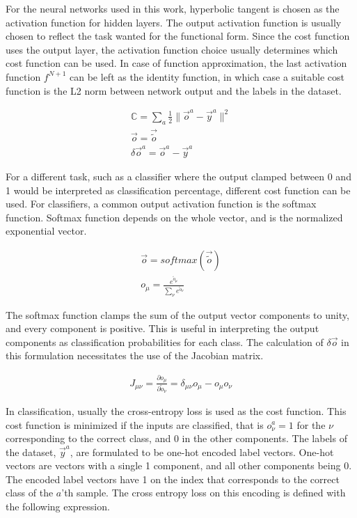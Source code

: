 \documentclass[../dissertation.tex]{subfiles}
\begin{document}
For the neural networks used in this work, hyperbolic tangent is chosen as the activation function for hidden layers.
The output activation function is usually chosen to reflect the task wanted for the functional form.
Since the cost function uses the output layer, the activation function choice usually determines which cost function can be used.
In case of function approximation, the last activation function $f^{N+1}$ can be left as the identity function, in which case a suitable cost function is the L2 norm between network output and the labels in the dataset.

\begin{align}
    \mathbb{C} = \sum_a \frac{1}{2} \| \vec{o}^a - \vec{y}^a \|^2 \\
    \vec{o} = \vec{\tilde{o}} \\
    \delta \vec{o}^a = \vec{o}^a - \vec{y}^a
\end{align}

For a different task, such as a classifier where the output clamped between 0 and 1 would be interpreted as classification percentage, different cost function can be used.
For classifiers, a common output activation function is the softmax function.
Softmax function depends on the whole vector, and is the normalized exponential vector.

\begin{align}
    \vec{o} = softmax \left( \vec{\tilde{o}} \right) \\
    o_\mu = \frac{e^{\tilde{o}_\mu}}{\sum_\nu e^{\tilde{o}_\nu}}
\end{align}

The softmax function clamps the sum of the output vector components to unity, and every component is positive.
This is useful in interpreting the output components as classification probabilities for each class.
The calculation of $\delta \vec{o}$ in this formulation necessitates the use of the Jacobian matrix.

\begin{align}
    J_{\mu\nu} = \frac{\partial o_\mu}{\partial \tilde{o}_\nu} = \delta_{\mu\nu} o_\mu - o_\mu o_\nu
\end{align}

In classification, usually the cross-entropy loss is used as the cost function.
This cost function is minimized if the inputs are classified, that is $o^a_\nu = 1$ for the $\nu$ corresponding to the correct class, and 0 in the other components.
The labels of the dataset, $\vec{y}^a$, are formulated to be one-hot encoded label vectors.
One-hot vectors are vectors with a single 1 component, and all other components being 0.
The encoded label vectors have 1 on the index that corresponds to the correct class of the $a$'th sample.
The cross entropy loss on this encoding is defined with the following expression.
\end{document}
